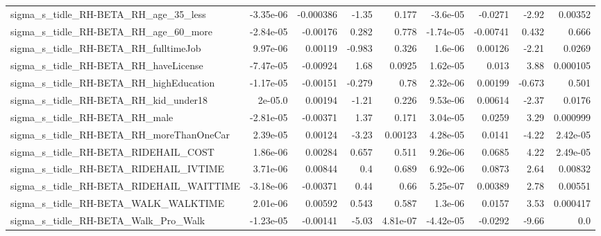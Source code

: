 \begin{tabular}{lrrrrrrrr}
sigma\_s\_tidle\_RH-BETA\_RH\_age\_35\_less               &   -3.35e-06 &    -0.000386 &     -1.35 &    0.177 &   -3.6e-05 &     -0.0271 &        -2.92 &       0.00352 \\
sigma\_s\_tidle\_RH-BETA\_RH\_age\_60\_more               &   -2.84e-05 &     -0.00176 &     0.282 &    0.778 &  -1.74e-05 &    -0.00741 &        0.432 &         0.666 \\
sigma\_s\_tidle\_RH-BETA\_RH\_fulltimeJob               &    9.97e-06 &      0.00119 &    -0.983 &    0.326 &    1.6e-06 &     0.00126 &        -2.21 &        0.0269 \\
sigma\_s\_tidle\_RH-BETA\_RH\_haveLicense               &   -7.47e-05 &     -0.00924 &      1.68 &   0.0925 &   1.62e-05 &       0.013 &         3.88 &      0.000105 \\
sigma\_s\_tidle\_RH-BETA\_RH\_highEducation             &   -1.17e-05 &     -0.00151 &    -0.279 &     0.78 &   2.32e-06 &     0.00199 &       -0.673 &         0.501 \\
sigma\_s\_tidle\_RH-BETA\_RH\_kid\_under18               &     2e-05.0 &      0.00194 &     -1.21 &    0.226 &   9.53e-06 &     0.00614 &        -2.37 &        0.0176 \\
sigma\_s\_tidle\_RH-BETA\_RH\_male                      &   -2.81e-05 &     -0.00371 &      1.37 &    0.171 &   3.04e-05 &      0.0259 &         3.29 &      0.000999 \\
sigma\_s\_tidle\_RH-BETA\_RH\_moreThanOneCar            &    2.39e-05 &      0.00124 &     -3.23 &  0.00123 &   4.28e-05 &      0.0141 &        -4.22 &      2.42e-05 \\
sigma\_s\_tidle\_RH-BETA\_RIDEHAIL\_COST                &    1.86e-06 &      0.00284 &     0.657 &    0.511 &   9.26e-06 &      0.0685 &         4.22 &      2.49e-05 \\
sigma\_s\_tidle\_RH-BETA\_RIDEHAIL\_IVTIME              &    3.71e-06 &      0.00844 &       0.4 &    0.689 &   6.92e-06 &      0.0873 &         2.64 &       0.00832 \\
sigma\_s\_tidle\_RH-BETA\_RIDEHAIL\_WAITTIME            &   -3.18e-06 &     -0.00371 &      0.44 &     0.66 &   5.25e-07 &     0.00389 &         2.78 &       0.00551 \\
sigma\_s\_tidle\_RH-BETA\_WALK\_WALKTIME                &    2.01e-06 &      0.00592 &     0.543 &    0.587 &    1.3e-06 &      0.0157 &         3.53 &      0.000417 \\
sigma\_s\_tidle\_RH-BETA\_Walk\_Pro\_Walk                &   -1.23e-05 &     -0.00141 &     -5.03 & 4.81e-07 &  -4.42e-05 &     -0.0292 &        -9.66 &           0.0 \\

\end{tabular}
